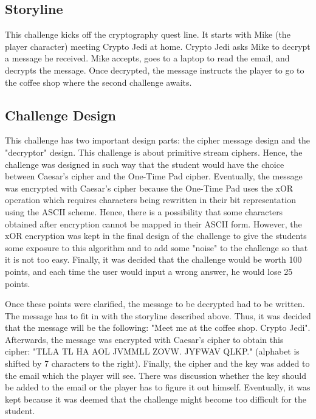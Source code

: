 \documentclass{l4proj}
\begin{document}
\subsection{Storyline}

This challenge kicks off the cryptography quest line. It starts with Mike (the player character) 
meeting Crypto Jedi at home. Crypto Jedi asks Mike to decrypt a message he received. Mike accepts, goes
to a laptop to read the email, and decrypts the message. Once decrypted, 
the message instructs the player to go to the coffee shop where the second challenge awaits.

\subsection{Challenge Design}

This challenge has two important design parts: the cipher message design and the "decryptor" design.
This challenge is about primitive stream ciphers. Hence, the challenge was designed in such way that
the student would have the choice between Caesar's cipher and the One-Time Pad cipher. Eventually,
the message was encrypted with Caesar's cipher because the One-Time Pad uses the xOR operation which requires
characters being rewritten in their bit representation using the ASCII scheme. 
Hence, there is a possibility that some characters obtained after encryption cannot be mapped in their ASCII form.
However, the xOR encryption was kept in the final design of the challenge to give the students some exposure
to this algorithm and to add some "noise" to the challenge so that it is not too easy.
Finally, it was decided that the challenge would be worth 100 points, and each time the user would input
a wrong answer, he would lose 25 points.

Once these points were clarified, the message to be decrypted had to be written. 
The message has to fit in with the storyline described above. 
Thus, it was decided that the message will be the following: "Meet me at the coffee shop. Crypto Jedi".
Afterwards, the message was encrypted with Caesar's cipher to obtain this cipher: "TLLA TL HA AOL JVMMLL ZOVW. JYFWAV QLKP."
(alphabet is shifted by 7 characters to the right). 
Finally, the cipher and the key was added to the email which the player will see.
There was discussion whether the key should be added to the email 
or the player has to figure it out himself. 
Eventually, it was kept because it was deemed that the challenge might become too difficult for the student.
\end{document}
